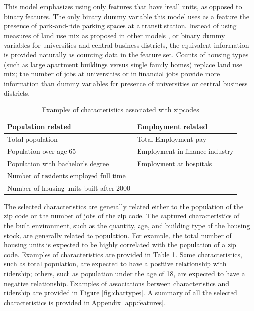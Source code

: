 \documentclass[11pt]{article}
\begin{document}
This model emphasizes using only features that have `real' units, as opposed to binary features. The only binary dummy variable this model uses as a feature the presence of park-and-ride parking spaces at a transit station. Instead of using measures of land use mix as proposed in other models \cite{Durning2015, Gutierrez2011}, or binary dummy variables for universities and central business districts, the equivalent information is provided naturally as counting data in the feature set. Counts of housing types (such as large apartment buildings versus single family homes) replace land use mix; the number of jobs at universities or in financial jobs provide more information than dummy variables for presence of universities or central business districts. 

\begin{table}[H]
\centering\begingroup\fontsize{10}{10}\selectfont
\begin{tabular}{ll}
\toprule \textbf{Population related}&\textbf{Employment related} \\ 
\midrule Total population&Total Employment pay\\
Population over age 65& Employment in finance industry\\
Population with bachelor's degree& Employment at hospitals\\
Number of residents employed full time&\\
Number of housing units built after 2000&\\
\bottomrule
\end{tabular}\endgroup
\caption{Examples of characteristics associated with zipcodes}\label{tab:char}
\end{table}

The selected characteristics are generally related either to the population of the zip code or the number of jobs of the zip code. The captured characteristics of the built environment, such as the quantity, age, and building type of the housing stock, are generally related to population. For example, the total number of housing units is expected to be highly correlated with the population of a zip code.  Examples of characteristics are provided in Table \ref{tab:char}. Some characteristics, such as total population, are expected to have a positive relationship with ridership; others, such as population under the age of 18, are expected to have a negative relationship. Examples of associations between characteristics and ridership are provided in Figure \ref{fig:chartypes}. A summary of all the selected characteristics is provided in Appendix \ref{app:features}.
\end{document}
